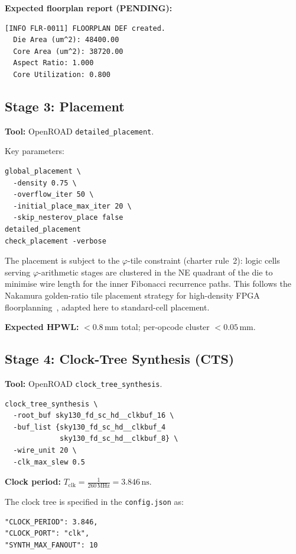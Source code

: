 \textbf{Expected floorplan report (PENDING):}

\begin{verbatim}
[INFO FLR-0011] FLOORPLAN DEF created.
  Die Area (um^2): 48400.00
  Core Area (um^2): 38720.00
  Aspect Ratio: 1.000
  Core Utilization: 0.800
\end{verbatim}

\subsection{Stage 3: Placement}
\label{subsec:72:stage3-placement}

\textbf{Tool:} OpenROAD \texttt{detailed\_placement}.

Key parameters:

\begin{verbatim}
global_placement \
  -density 0.75 \
  -overflow_iter 50 \
  -initial_place_max_iter 20 \
  -skip_nesterov_place false
detailed_placement
check_placement -verbose
\end{verbatim}

The placement is subject to the $\varphi$-tile constraint
(charter rule~2): logic cells serving $\varphi$-arithmetic stages
are clustered in the NE quadrant of the die to minimise wire length
for the inner Fibonacci recurrence paths.
This follows the Nakamura golden-ratio tile placement strategy
for high-density FPGA floorplanning~\cite{nakamura2018fpga},
adapted here to standard-cell placement.

\textbf{Expected HPWL:} $< 0.8\,\mathrm{mm}$ total; per-opcode cluster
$< 0.05\,\mathrm{mm}$.

\subsection{Stage 4: Clock-Tree Synthesis (CTS)}
\label{subsec:72:stage4-cts}

\textbf{Tool:} OpenROAD \texttt{clock\_tree\_synthesis}.

\begin{verbatim}
clock_tree_synthesis \
  -root_buf sky130_fd_sc_hd__clkbuf_16 \
  -buf_list {sky130_fd_sc_hd__clkbuf_4
             sky130_fd_sc_hd__clkbuf_8} \
  -wire_unit 20 \
  -clk_max_slew 0.5
\end{verbatim}

\textbf{Clock period:} $T_{\text{clk}} = \tfrac{1}{260\,\text{MHz}}
  = 3.846\,\mathrm{ns}$.

The clock tree is specified in the \texttt{config.json} as:
\begin{verbatim}
"CLOCK_PERIOD": 3.846,
"CLOCK_PORT": "clk",
"SYNTH_MAX_FANOUT": 10
\end{verbatim}

